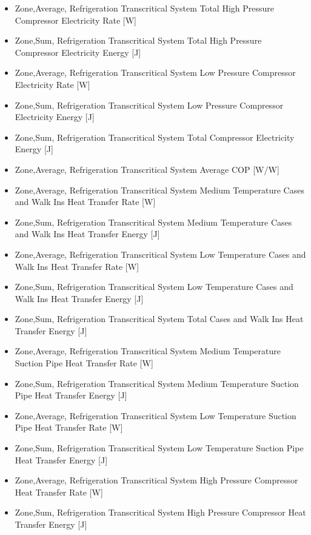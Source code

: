 \begin{itemize}
\item
  Zone,Average, Refrigeration Transcritical System Total High Pressure Compressor Electricity Rate {[}W{]}
\item
  Zone,Sum, Refrigeration Transcritical System Total High Pressure Compressor Electricity Energy {[}J{]}
\item
  Zone,Average, Refrigeration Transcritical System Low Pressure Compressor Electricity Rate {[}W{]}
\item
  Zone,Sum, Refrigeration Transcritical System Low Pressure Compressor Electricity Energy {[}J{]}
\item
  Zone,Sum, Refrigeration Transcritical System Total Compressor Electricity Energy {[}J{]}
\item
  Zone,Average, Refrigeration Transcritical System Average COP {[}W/W{]}
\item
  Zone,Average, Refrigeration Transcritical System Medium Temperature Cases and Walk Ins Heat Transfer Rate {[}W{]}
\item
  Zone,Sum, Refrigeration Transcritical System Medium Temperature Cases and Walk Ins Heat Transfer Energy {[}J{]}
\item
  Zone,Average, Refrigeration Transcritical System Low Temperature Cases and Walk Ins Heat Transfer Rate {[}W{]}
\item
  Zone,Sum, Refrigeration Transcritical System Low Temperature Cases and Walk Ins Heat Transfer Energy {[}J{]}
\item
  Zone,Sum, Refrigeration Transcritical System Total Cases and Walk Ins Heat Transfer Energy {[}J{]}
\item
  Zone,Average, Refrigeration Transcritical System Medium Temperature Suction Pipe Heat Transfer Rate {[}W{]}
\item
  Zone,Sum, Refrigeration Transcritical System Medium Temperature Suction Pipe Heat Transfer Energy {[}J{]}
\item
  Zone,Average, Refrigeration Transcritical System Low Temperature Suction Pipe Heat Transfer Rate {[}W{]}
\item
  Zone,Sum, Refrigeration Transcritical System Low Temperature Suction Pipe Heat Transfer Energy {[}J{]}
\item
  Zone,Average, Refrigeration Transcritical System High Pressure Compressor Heat Transfer Rate {[}W{]}
\item
  Zone,Sum, Refrigeration Transcritical System High Pressure Compressor Heat Transfer Energy {[}J{]}

\end{itemize}
